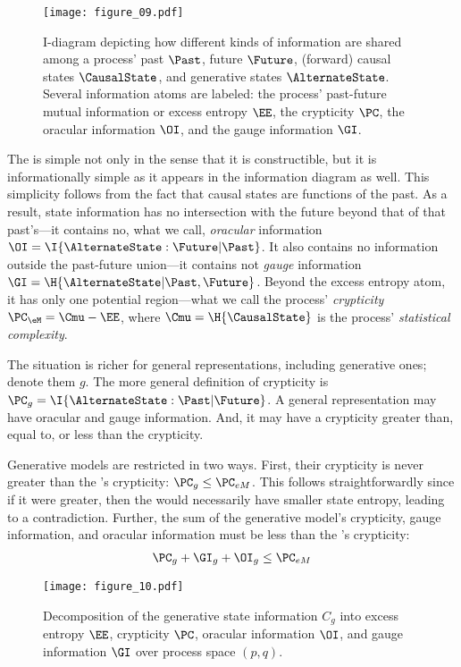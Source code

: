 \documentclass[final,nofootinbib,aps,pre,twocolumn,showpacs,groupaddress,preprintnumbers,floatfix]{revtex4-1}
\newcommand{\Cg}{\ensuremath{C_g}\xspace}
\begin{document}
\begin{figure}
\centering
\clearpage{}\texttt{[image: figure\_09.pdf]}
\clearpage{}
\caption{I-diagram depicting how different kinds of information are shared
	among a process' past $\Past$, future $\Future$, (forward) causal states
	$\CausalState$, and generative states $\AlternateState$. Several
	information atoms are labeled: the process' past-future mutual information
	or excess entropy $\EE$, the crypticity $\PC$, the oracular information
	$\OI$, and the gauge information $\GI$.
	}
\label{fig:idiagram}
\end{figure}

The \eM is simple not only in the sense that it is constructible, but it is
informationally simple as it appears in the information diagram as well.  This
simplicity follows from the fact that causal states are functions of the past.
As a result, \eM state information has no intersection with the future beyond
that of that past's---it contains no, what we call, \emph{oracular} information
$\OI = \I{\AlternateState:\Future|\Past}$. It also contains no information
outside the past-future union---it contains not \emph{gauge} information $\GI =
\H{\AlternateState|\Past,\Future}$. Beyond the excess entropy atom, it has only
one potential region---what we call the process' \emph{crypticity} $\PC_{\eM} =
\Cmu - \EE$, where $\Cmu = \H{\CausalState}$ is the process' \emph{statistical
complexity}.

The situation is richer for general representations, including generative ones;
denote them $g$. The more general definition of crypticity is $\PC_g =
\I{\AlternateState : \Past | \Future}$. A general representation may have
oracular and gauge information. And, it may have a crypticity greater than,
equal to, or less than the \eM crypticity.

Generative models are restricted in two ways.  First, their crypticity is never greater than the \eM's crypticity: $\PC_g \leq \PC_{eM}$. This follows straightforwardly since if it were greater, then the \eM would necessarily have smaller state entropy, leading to a contradiction. Further, the sum of the generative model's crypticity, gauge information, and oracular information must be less than the \eM's crypticity:
\begin{align}
  \PC_g + \GI_g + \OI_g \leq \PC_{eM}
  \label{eq:gen_vs_em}
\end{align}

\begin{figure}
\centering
\texttt{[image: figure\_10.pdf]}
 \caption{Decomposition of the generative state information \Cg into excess
	entropy $\EE$, crypticity $\PC$, oracular information $\OI$, and gauge
	information $\GI$ over process space $(p,q)$.
  }
\label{fig:cg_synccontrol}
\end{figure}
\end{document}
